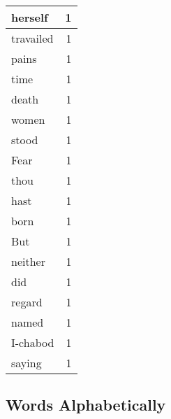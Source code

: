 \begin{center}
\begin{longtable}{l|r}
herself & 1 \\ \hline
travailed & 1 \\ \hline
pains & 1 \\ \hline
time & 1 \\ \hline
death & 1 \\ \hline
women & 1 \\ \hline
stood & 1 \\ \hline
Fear & 1 \\ \hline
thou & 1 \\ \hline
hast & 1 \\ \hline
born & 1 \\ \hline
But & 1 \\ \hline
neither & 1 \\ \hline
did & 1 \\ \hline
regard & 1 \\ \hline
named & 1 \\ \hline
I-chabod & 1 \\ \hline
saying & 1 \\ \hline
\end{longtable}
\end{center}



\normalsize



\subsection{Words Alphabetically}

